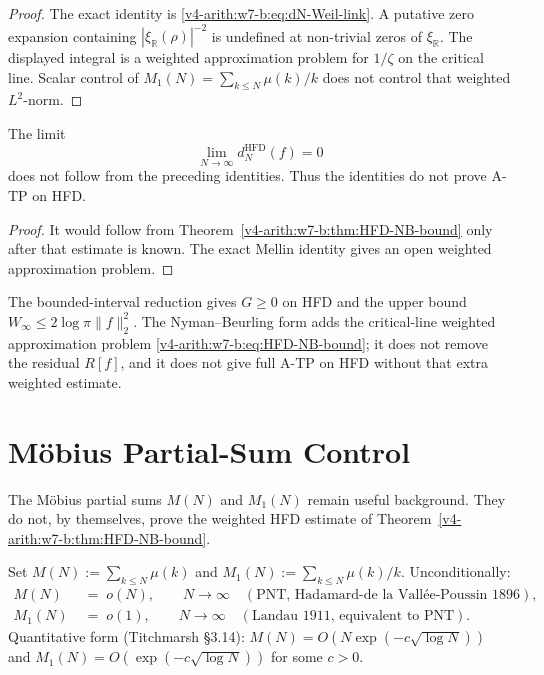 \begin{proof}
The exact identity is \eqref{v4-arith:w7-b:eq:dN-Weil-link}. A putative zero expansion containing
\(|\xi_{\mathbb R}(\rho)|^{-2}\) is undefined at non-trivial
zeros of \(\xi_{\mathbb R}\). The displayed integral is a weighted approximation
problem for \(1/\zeta\) on the critical line. Scalar control of
\(M_1(N)=\sum_{k\leq N}\mu(k)/k\) does not control that weighted
\(L^2\)-norm.
\end{proof}

\begin{corollary}
\label{v4-arith:w7-b:cor:HFD-ATP-NB}
The limit
\[
\lim_{N\to\infty}d_{N}^{\mathrm{HFD}}(f)=0
\]
does not follow from the preceding identities. Thus the identities
do not prove A-TP on HFD.
\end{corollary}

\begin{proof}
It would follow from Theorem~\ref{v4-arith:w7-b:thm:HFD-NB-bound} only after
that estimate is known. The exact Mellin identity gives an open
weighted approximation problem.
\end{proof}

\begin{remark}
\label{v4-arith:w7-b:rem:cross-walk-wave6}
The bounded-interval reduction gives \(G\ge0\) on HFD and the
upper bound \(W_\infty\le2\log\pi\|f\|_2^2\). The
Nyman--Beurling form adds the critical-line weighted approximation
problem
\eqref{v4-arith:w7-b:eq:HFD-NB-bound}; it does not remove the
residual \(R[f]\), and it does not give full A-TP on HFD without that
extra weighted estimate.
\end{remark}

\section{M\"obius Partial-Sum Control}
\label{v4-arith:w7-b:sec:mobius-control}

The M\"obius partial sums \(M(N)\) and \(M_{1}(N)\) remain useful
background. They do not, by themselves, prove the weighted
HFD estimate of Theorem~\ref{v4-arith:w7-b:thm:HFD-NB-bound}.

\begin{proposition}
\label{v4-arith:w7-b:prop:mertens-uncond}
Set \(M(N):=\sum_{k\leq N}\mu(k)\) and
\(M_{1}(N):=\sum_{k\leq N}\mu(k)/k\). Unconditionally:
\begin{align}
\label{v4-arith:w7-b:eq:M-classical}
M(N)&\;=\;o(N),\qquad N\to\infty\quad(\text{PNT, Hadamard-de la Vall\'ee-Poussin 1896}),\\
\label{v4-arith:w7-b:eq:M1-classical}
M_{1}(N)&\;=\;o(1),\qquad N\to\infty\quad(\text{Landau 1911, equivalent to PNT}).
\end{align}
Quantitative form (Titchmarsh \S3.14):
\(M(N)=O(N\exp(-c\sqrt{\log N}))\) and
\(M_{1}(N)=O(\exp(-c\sqrt{\log N}))\) for some \(c>0\).
\end{proposition}

